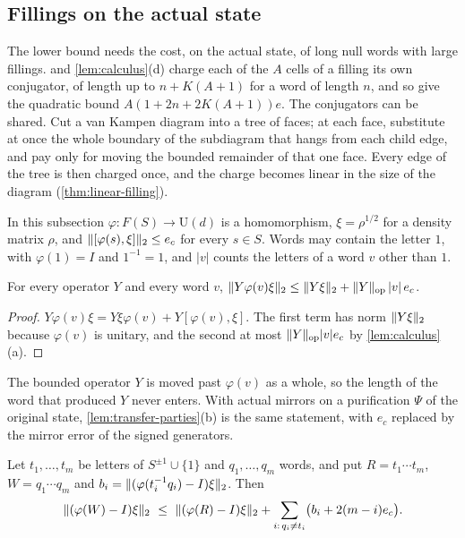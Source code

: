 \subsection{Fillings on the actual state}\label{sec:point-filling}

The lower bound needs the cost, on the actual state, of long null words with large fillings.  and
\cref{lem:calculus}(d) charge each of the $A$ cells of a filling its own conjugator, of length up to $n+K(A+1)$ for a word of
length $n$, and so give the quadratic bound $A(1+2n+2K(A+1))e$. The conjugators can be shared. Cut a van Kampen diagram into a
tree of faces; at each face, substitute at once the whole boundary of the subdiagram that hangs from each child edge, and pay only
for moving the bounded remainder of that one face. Every edge of the tree is then charged once, and the charge becomes linear in
the size of the diagram (\cref{thm:linear-filling}).

In this subsection $\varphi:F(S)\to\mathrm U(d)$ is a homomorphism, $\xi=\rho^{1/2}$ for a density matrix $\rho$, and
$\lVert [\varphi(s),\xi]\rVert_2\le e_c$ for every $s\in S$. Words may contain the letter $1$, with $\varphi(1)=I$ and $1^{-1}=1$, and $|v|$
counts the letters of a word $v$ other than $1$.

\begin{lemma}\label{lem:bounded-transport}
For every operator $Y$ and every word $v$, $\lVert Y\varphi(v)\xi\rVert_2\le\lVert Y\xi\rVert_2+\lVert Y\rVert_{\mathrm{op}}\,|v|\,e_c$.
\end{lemma}

\begin{proof}
$Y\varphi(v)\xi=Y\xi\varphi(v)+Y[\varphi(v),\xi]$. The first term has norm $\lVert Y\xi\rVert_2$ because $\varphi(v)$ is unitary, and the
second at most $\lVert Y\rVert_{\mathrm{op}}|v|e_c$ by \cref{lem:calculus}(a).
\end{proof}

The bounded operator $Y$ is moved past $\varphi(v)$ as a whole, so the length of the word that produced $Y$ never enters. With
actual mirrors on a purification $\Psi$ of the original state, \cref{lem:transfer-parties}(b) is the same statement, with $e_c$
replaced by the mirror error of the signed generators.

\begin{lemma}\label{lem:face-substitution}
Let $t_1,\dots,t_m$ be letters of $S^{\pm1}\cup\{1\}$ and $q_1,\dots,q_m$ words, and put $R=t_1\cdots t_m$, $W=q_1\cdots q_m$ and
$b_i=\lVert (\varphi(t_i^{-1}q_i)-I)\xi\rVert_2$. Then
\[
\hs{(\varphi(W)-I)\xi}\ \le\ \hs{(\varphi(R)-I)\xi}+\sum_{i:\,q_i\ne t_i}\bigl(b_i+2(m-i)e_c\bigr).
\]
\end{lemma}

